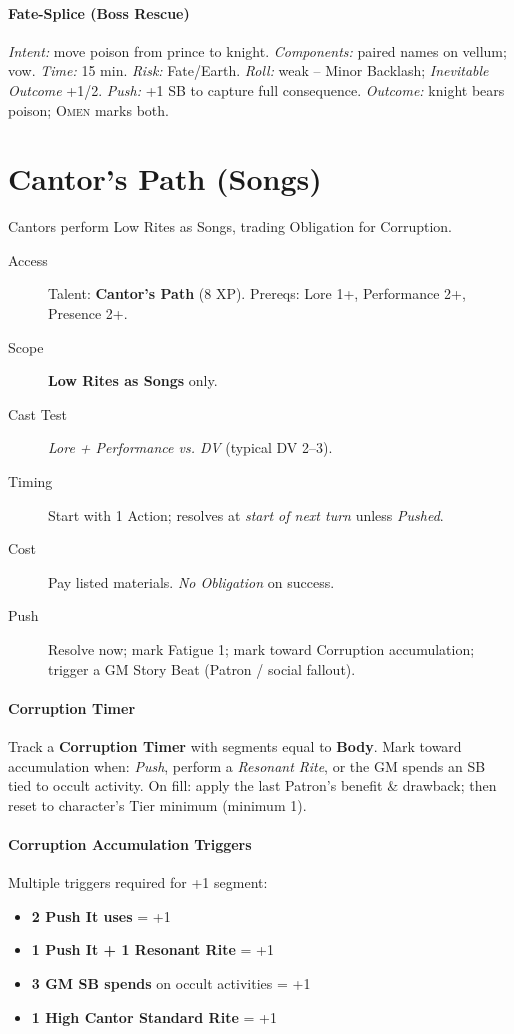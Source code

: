\paragraph{Fate-Splice (Boss Rescue)} \emph{Intent:} move poison from prince to knight. \emph{Components:} paired names on vellum; vow. \emph{Time:} 15 min. \emph{Risk:} Fate/Earth. \emph{Roll:} weak -- Minor Backlash; \emph{Inevitable Outcome} +1/2. \emph{Push:} +1 SB to capture full consequence. \emph{Outcome:} knight bears poison; \textsc{Omen} marks both.

\section{Cantor's Path (Songs)}\label{sec:cantors_path}

Cantors perform Low Rites as Songs, trading Obligation for Corruption.

\begin{description}
    \item[Access] Talent: \textbf{Cantor's Path} (8 XP). Prereqs: Lore 1+, Performance 2+, Presence 2+.
    \item[Scope] \textbf{Low Rites as Songs} only.
    \item[Cast Test] \emph{Lore + Performance vs. DV} (typical DV 2--3).
    \item[Timing] Start with 1 Action; resolves at \emph{start of next turn} unless \emph{Pushed}.
    \item[Cost] Pay listed materials. \emph{No Obligation} on success.
    \item[Push] Resolve now; mark Fatigue 1; mark toward Corruption accumulation; trigger a GM Story Beat (Patron / social fallout).
\end{description}

\paragraph{Corruption Timer }
Track a \textbf{Corruption Timer } with segments equal to \textbf{Body}. Mark toward accumulation when: \emph{Push}, perform a \emph{Resonant Rite}, or the GM spends an SB tied to occult activity. On fill: apply the last Patron's benefit \& drawback; then reset to character's Tier minimum (minimum 1).

\paragraph{Corruption Accumulation Triggers}
Multiple triggers required for +1 segment:
\begin{itemize}
    \item \textbf{2 Push It uses} = +1
    \item \textbf{1 Push It + 1 Resonant Rite} = +1
    \item \textbf{3 GM SB spends} on occult activities = +1
    \item \textbf{1 High Cantor Standard Rite} = +1
\end{itemize}

